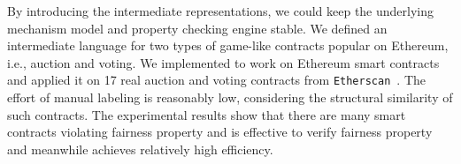 By introducing the intermediate representations, we could keep the underlying mechanism model and
property checking engine stable.
We defined an intermediate language for two types of game-like contracts popular on Ethereum, i.e.,
auction and voting.
We implemented \tool to work on Ethereum smart contracts and applied it on 17 real auction and
voting contracts from \texttt{Etherscan}~\cite{Etherscan}.
The effort of manual labeling is reasonably low, considering the structural similarity of such
contracts.
The experimental results show that there are many smart contracts violating fairness property and \tool is effective to verify fairness property and meanwhile achieves relatively high efficiency.


